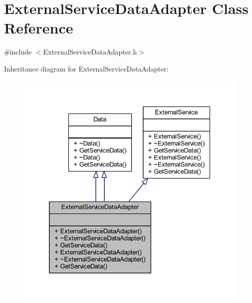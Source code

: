 \hypertarget{class_external_service_data_adapter}{}\section{External\+Service\+Data\+Adapter Class Reference}
\label{class_external_service_data_adapter}


{\ttfamily \#include $<$External\+Service\+Data\+Adapter.\+h$>$}



Inheritance diagram for External\+Service\+Data\+Adapter\+:\nopagebreak
\begin{figure}[H]
\begin{center}
\leavevmode
\includegraphics[width=332pt]{class_external_service_data_adapter__inherit__graph}
\end{center}
\end{figure}


